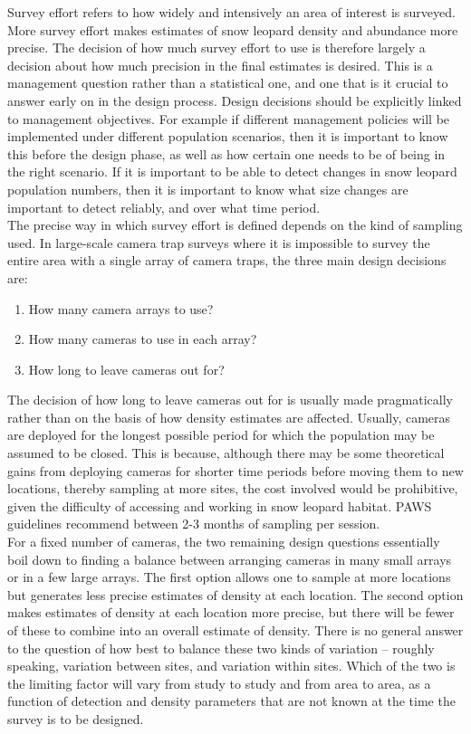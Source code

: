 \documentclass[a4paper,11pt, draft]{article} %
\begin{document}
Survey effort refers to how widely and intensively an area of interest is surveyed. More survey effort makes estimates of snow leopard density and abundance more precise. The decision of how much survey effort to use is therefore largely a decision about how much precision in the final estimates is desired. This is a management question rather than a statistical one, and one that is it crucial to answer early on in the design process. Design decisions should be explicitly linked to management objectives. For example if different management policies will be implemented under different population scenarios, then it is important to know this before the design phase, as well as how certain one needs to be of being in the right scenario. If it is important to be able to detect changes in snow leopard population numbers, then it is important to know what size changes are important to detect reliably, and over what time period. 
\\[1em]
The precise way in which survey effort is defined depends on the kind of sampling used. In large-scale camera trap surveys where it is impossible to survey the entire area with a single array of camera traps, the three main design decisions are:
\begin{enumerate}
\item How many camera arrays to use? 
\item How many cameras to use in each array?
\item How long to leave cameras out for?
\end{enumerate}
The decision of how long to leave cameras out for is usually made pragmatically rather than on the basis of how density estimates are affected. Usually, cameras are deployed for the longest possible period for which the population may be assumed to be closed. This is because, although there may be some theoretical gains from deploying cameras for shorter time periods before moving them to new locations, thereby sampling at more sites, the cost involved would be prohibitive, given the difficulty of accessing and working in snow leopard habitat. PAWS guidelines recommend between 2-3 months of sampling per session. 
\\[1em]
For a fixed number of cameras, the two remaining design questions essentially boil down to finding a balance between arranging cameras in many small arrays or in a few large arrays. The first option allows one to sample at more locations but generates less precise estimates of density at each location. The second option makes estimates of density at each location more precise, but there will be fewer of these to combine into an overall estimate of density. There is no general answer to the question of how best to balance these two kinds of variation -- roughly speaking, variation between sites, and variation within sites. Which of the two is the limiting factor will vary from study to study and from area to area, as a function of detection and density parameters that are not known at the time the survey is to be designed.
\end{document}
